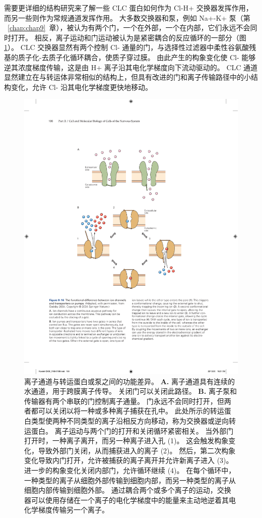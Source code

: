 需要更详细的结构研究来了解一些 CLC 蛋白如何作为 Cl-H+ 交换器发挥作用，而另一些则作为常规通道发挥作用。
大多数交换器和泵，例如 Na+-K+ 泵（第 ~\ref{chap:chap9}~章），被认为有两个门，一个在外部，一个在内部，它们永远不会同时打开。
相反，离子运动和门运动被认为是紧密耦合的反应循环的一部分（图\ref{fig:8_16}）。
CLC 交换器显然有两个控制 Cl- 通量的门，与选择性过滤器中柔性谷氨酸残基的质子化-去质子化循环耦合，使质子穿过膜。
由此产生的构象变化使 Cl- 能够逆其浓度梯度传输，这是由 H+ 离子沿其电化学梯度向下流动驱动的。
CLC 通道显然建立在与转运体非常相似的结构上，但具有改进的门和离子传输路径中的小结构变化，允许 Cl- 沿其电化学梯度更快地移动。


\begin{figure}[htbp]
	\centering
	\includegraphics[width=0.6\linewidth]{chap08/fig_8_16}
	\caption{离子通道与转运蛋白或泵之间的功能差异\cite{gadsby2004spot}。 
		\textbf{A.} 离子通道具有连续的水通道，用于跨膜离子传导。
		关闭门可以关闭此路径。
		\textbf{B.} 离子泵和传输器有两个串联的门控制离子通量。
		门永远不会同时打开，但两者都可以关闭以将一种或多种离子捕获在孔中。
		此处所示的转运蛋白类型使两种不同类型的离子沿相反方向移动，称为交换器或逆向转运蛋白。
		离子运动与两个门的打开和关闭循环紧密相关。
		当外部门打开时，一种离子离开，而另一种离子进入孔 (1)。
		这会触发构象变化，导致外部门关闭，从而捕获进入的离子 (2)。
		然后，第二次构象变化导致内门打开，允许被捕获的离子离开并允许新离子进入 (3)。
		进一步的构象变化关闭内部门，允许循环继续 (4)。
		在每个循环中，一种类型的离子从细胞外部传输到细胞内部，而另一种类型的离子从细胞内部传输到细胞外部。
		通过耦合两个或多个离子的运动，交换器可以使用存储在一个离子的电化学梯度中的能量来主动地逆着其电化学梯度传输另一个离子。}
	\label{fig:8_16}
\end{figure}




